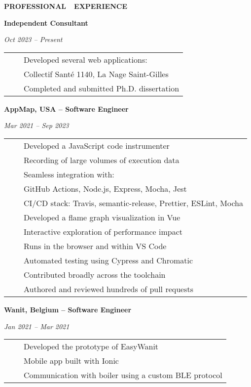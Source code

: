 \documentclass[a4paper,11pt,english]{article}
\newcommand{\MarginColumn}[0]{28pt}
\newcommand{\RightColumn}[0]{10.5cm}
\newcommand{\ItemSkip}[0]{4pt}
\newcommand{\SubItemSkip}[0]{0pt}
\newcommand{\SubSubItemSkip}[0]{0pt}
\newcommand{\Bullet}[0]{\faCaretRight~~}
\newcommand{\BeginSubRubricSkip}[0]{6pt}
\newcommand{\EndSubRubric}[0]{\vspace{4pt}}
\newcommand{\Rubric}[1]{\colorbox{gray!20}{\parbox{\linewidth}{\centering\sffamily\bfseries{}#1}}}
\newcommand{\SubRubric}[1]{\parbox{\linewidth}{\sffamily\bfseries{}#1}}
\begin{document}
\hspace{\MarginColumn}
\begin{minipage}[t]{\RightColumn}
\vspace{-18pt}\Rubric{\faBriefcase \quad PROFESSIONAL~~EXPERIENCE}\vspace{16pt}

\SubRubric{Independent Consultant}
\emph{Oct 2023 -- Present} \\[\BeginSubRubricSkip]
\begin{tabularx}{\linewidth}{@{}l@{}l@{}}
\Bullet & Developed several web applications: \\[\SubSubItemSkip]
& \quad Collectif Santé 1140, La Nage Saint-Gilles \\[\SubItemSkip]
\Bullet & Completed and submitted Ph.D. dissertation \\[\ItemSkip]
\end{tabularx}
\EndSubRubric{}

\SubRubric{AppMap, USA -- Software Engineer}
\emph{Mar 2021 -- Sep 2023} \\[\BeginSubRubricSkip]
\begin{tabularx}{\linewidth}{@{}l@{}l@{}}
\Bullet & Developed a JavaScript code instrumenter \\[\SubItemSkip]
& Recording of large volumes of execution data \\[\SubItemSkip]
& Seamless integration with: \\[\SubSubItemSkip]
& \quad GitHub Actions, Node.js, Express, Mocha, Jest \\[\SubItemSkip]
& CI/CD stack: Travis, semantic-release, Prettier, ESLint, Mocha \\[\ItemSkip]
\Bullet & Developed a flame graph visualization in Vue \\[\SubItemSkip]
& Interactive exploration of performance impact \\[\SubItemSkip]
& Runs in the browser and within VS Code \\[\SubItemSkip]
& Automated testing using Cypress and Chromatic \\[\ItemSkip]
\Bullet & Contributed broadly across the toolchain \\[\SubItemSkip]
& Authored and reviewed hundreds of pull requests \\[\ItemSkip]
\end{tabularx}
\EndSubRubric{}

\SubRubric{Wanit, Belgium -- Software Engineer}
\emph{Jan 2021 -- Mar 2021} \\[\BeginSubRubricSkip]
\begin{tabularx}{\linewidth}{@{}l@{}l@{}}
\Bullet & Developed the prototype of EasyWanit \\[\SubItemSkip]
& Mobile app built with Ionic \\[\SubItemSkip]
& Communication with boiler using a custom BLE protocol \\[\ItemSkip]
\end{tabularx}
\EndSubRubric{}


\end{minipage}
\end{document}
